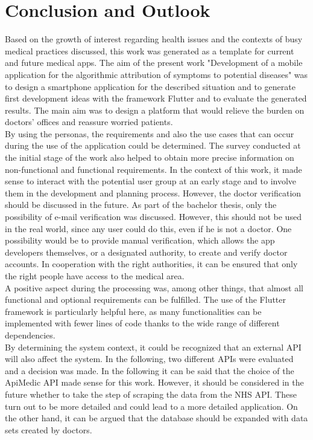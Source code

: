 \chapter{Conclusion and Outlook}
Based on the growth of interest regarding health issues and the contexts of busy medical practices discussed, this work was generated as a template for current and future medical apps.
The aim of the present work "Development of a mobile application for the algorithmic attribution of symptoms to potential diseases" was to design a smartphone application for the described situation and to generate first development ideas with the framework Flutter and to evaluate the generated results.  The main aim was to design a platform that would relieve the burden on doctors' offices and reassure worried patients. 
\newline \\
By using the personas, the requirements and also the use cases that can occur during the use of the application could be determined. The survey conducted at the initial stage of the work also helped to obtain more precise information on non-functional and functional requirements. In the context of this work, it made sense to interact with the potential user group at an early stage and to involve them in the development and planning process. However, the doctor verification should be discussed in the future. As part of the bachelor thesis, only the possibility of e-mail verification was discussed. However, this should not be used in the real world, since any user could do this, even if he is not a doctor. One possibility would be to provide manual verification, which allows the app developers themselves, or a designated authority, to create and verify doctor accounts. In cooperation with the right authorities, it can be ensured that only the right people have access to the medical area.
\newline \\
A positive aspect during the processing was, among other things, that almost all functional and optional requirements can be fulfilled. The use of the Flutter framework is particularly helpful here, as many functionalities can be implemented with fewer lines of code thanks to the wide range of different dependencies.
\newline \\
By determining the system context, it could be recognized that an external API will also affect the system. In the following, two different APIs were evaluated and a decision was made. In the following it can be said that the choice of the ApiMedic API made sense for this work. However, it should be considered in the future whether to take the step of scraping the data from the NHS API. These turn out to be more detailed and could lead to a more detailed application. On the other hand, it can be argued that the database should be expanded with data sets created by doctors. 
